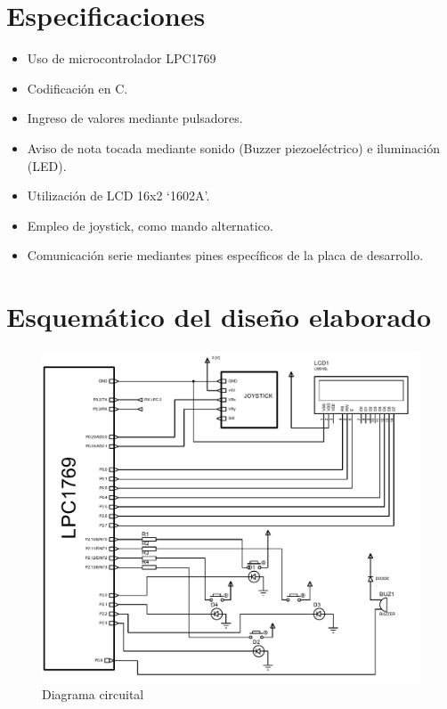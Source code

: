 \documentclass[paper=letter, fontsize=12pt]{article}
\begin{document}
\hfill \break

\section{\textbf{Especificaciones}}
\begin{itemize}
\item Uso de microcontrolador LPC1769
\item Codificación en C.
\item Ingreso de valores mediante pulsadores.
\item Aviso de nota tocada mediante sonido (Buzzer piezoeléctrico) e iluminación (LED).
\item Utilización de LCD 16x2 ‘1602A’.
\item Empleo de joystick, como mando alternatico.
\item Comunicación serie mediantes pines específicos de la placa de desarrollo.
\end{itemize}

\clearpage

\section{\textbf{Esquemático del diseño elaborado}}
\begin{figure}[H]
  \includegraphics[scale=0.85]{PROJ.pdf}
  \caption{Diagrama circuital}
 \end{figure}
\end{document}
